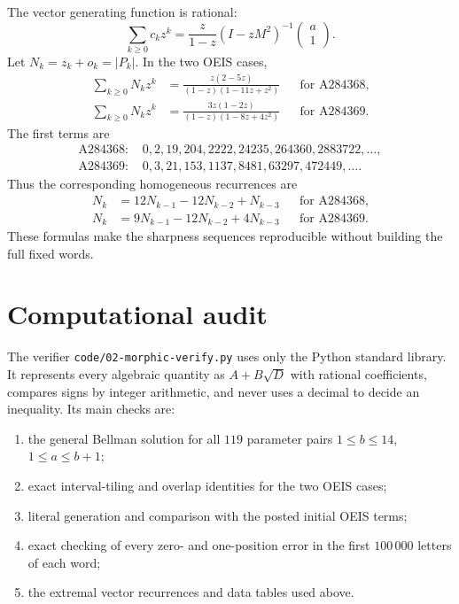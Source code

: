 \documentclass[11pt]{article}
\numberwithin{equation}{section}
\theoremstyle{definition}
\theoremstyle{remark}
\newcommand{\abs}[1]{\lvert#1\rvert}
\begin{document}
The vector generating function is rational:
\begin{equation}\label{qmw:eq:vectorGF}
\sum_{k\geq0}c_kz^k
=\frac{z}{1-z}(I-zM^2)^{-1}
\begin{pmatrix}a\\1\end{pmatrix}.
\end{equation}
Let $N_k=z_k+o_k=\abs{P_k}$.  In the two OEIS cases,
\begin{align}
\sum_{k\geq0}N_kz^k
&=\frac{z(2-5z)}{(1-z)(1-11z+z^2)}
&&\text{for A284368},
\label{qmw:eq:GF368}\\
\sum_{k\geq0}N_kz^k
&=\frac{3z(1-2z)}{(1-z)(1-8z+4z^2)}
&&\text{for A284369}.
\label{qmw:eq:GF369}
\end{align}
The first terms are
\begin{align*}
\text{A284368: }&0,2,19,204,2222,24235,264360,2883722,\ldots,\\
\text{A284369: }&0,3,21,153,1137,8481,63297,472449,\ldots.
\end{align*}
Thus the corresponding homogeneous recurrences are
\begin{align*}
N_k&=12N_{k-1}-12N_{k-2}+N_{k-3}
&&\text{for A284368},\\
N_k&=9N_{k-1}-12N_{k-2}+4N_{k-3}
&&\text{for A284369}.
\end{align*}
These formulas make the sharpness sequences reproducible without building the
full fixed words.

\section{Computational audit}\label{qmw:sec:verification}

The verifier \texttt{code/02-morphic-verify.py} uses only the Python standard library.
It represents every algebraic quantity as $A+B\sqrt D$ with rational
coefficients, compares signs by integer arithmetic, and never uses a decimal
to decide an inequality.  Its main checks are:

\begin{enumerate}[leftmargin=*,itemsep=2pt]
\item the general Bellman solution for all $119$ parameter pairs
      $1\leq b\leq14$, $1\leq a\leq b+1$;
\item exact interval-tiling and overlap identities for the two OEIS cases;
\item literal generation and comparison with the posted initial OEIS terms;
\item exact checking of every zero- and one-position error in the first
      $100\,000$ letters of each word;
\item the extremal vector recurrences and data tables used above.
\end{enumerate}
\end{document}
